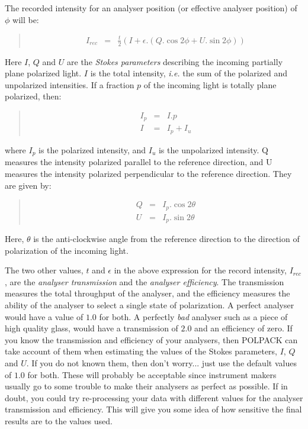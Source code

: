 \documentclass[twoside,11pt]{starlink}
\newenvironment{myquote}{\begin{quote}\begin{small}}{\end{small}\end{quote}}
\begin{document}
The recorded intensity for an analyser position (or effective analyser
position) of $\phi$ will be:

\begin{myquote}
\begin{eqnarray}
\label{EQN:IREC}
  I_{rec} & = & \frac{t}{2}( I + \epsilon.( Q.\cos 2\phi + U.\sin 2\phi ) )
\end{eqnarray}
\end{myquote}

Here $I$, $Q$ and $U$ are the \emph{Stokes parameters} describing the
incoming partially plane polarized light. $I$ is the total intensity,
\emph{i.e.} the sum of the polarized and unpolarized intensities. If a
fraction $p$ of the incoming light is totally plane polarized, then:

\begin{myquote}
\begin{eqnarray*}
  I_{p} & = & I.p \\
  I & = & I_{p} + I_{u}
\end{eqnarray*}
\end{myquote}

where $I_{p}$ is the polarized intensity, and $I_{u}$ is the unpolarized
intensity. Q measures the intensity polarized parallel to the reference
direction, and U measures the intensity polarized perpendicular to the
reference direction. They are given by:

\begin{myquote}
\begin{eqnarray*}
  Q & = & I_{p}.\cos 2\theta \\
  U & = & I_{p}.\sin 2\theta
\end{eqnarray*}
\end{myquote}

Here, $\theta$ is the anti-clockwise angle from the reference direction to
the direction of polarization of the incoming light.

The two other values, $t$ and $\epsilon$ in the above expression for the
record intensity, $I_{rec}$, are the \emph{analyser transmission} and the
\emph{analyser efficiency}. The transmission measures the total
throughput of the analyser, and the efficiency measures the ability of
the analyser to select a single state of polarization. A perfect analyser
would have a value of $1.0$ for both. A perfectly \emph{bad} analyser
such as a piece of high quality glass, would have a transmission of $2.0$
and an efficiency of zero. If you know the transmission and efficiency of
your analysers, then POLPACK can take account of them when estimating the
values of the Stokes parameters, $I$, $Q$ and $U$. If you do not known
them, then don't worry... just use the default values of $1.0$ for both.
These will probably be acceptable since instrument makers usually go to
some trouble to make their analysers as perfect as possible. If in doubt,
you could try re-processing your data with different values for the
analyser transmission and efficiency. This will give you some idea of how
sensitive the final results are to the values used.
\end{document}
